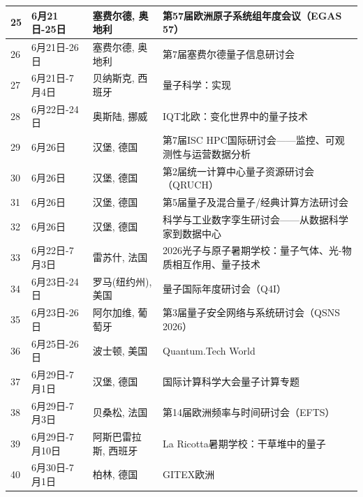 \documentclass[12pt,a4paper]{ctexart}
\begin{document}
{\begin{longtable}{C{0.8cm}L{2.5cm}L{3cm}L{7cm}}
        25 & 6月21日-25日 & 塞费尔德, 奥地利 & 第57届欧洲原子系统组年度会议（EGAS 57） \\
        \midrule[0.05pt]
        
        26 & 6月21日-26日 & 塞费尔德, 奥地利 & 第7届塞费尔德量子信息研讨会 \\
        \midrule[0.05pt]
        
        27 & 6月21日-7月4日 & 贝纳斯克, 西班牙 & 量子科学：实现 \\
        \midrule[0.05pt]
        
        28 & 6月22日-24日 & 奥斯陆, 挪威 & IQT北欧：变化世界中的量子技术 \\
        \midrule[0.05pt]
        
        29 & 6月26日 & 汉堡, 德国 & 第7届ISC HPC国际研讨会——监控、可观测性与运营数据分析 \\
        \midrule[0.05pt]
        
        30 & 6月26日 & 汉堡, 德国 & 第2届统一计算中心量子资源研讨会（QRUCH） \\
        \midrule[0.05pt]
        
        31 & 6月26日 & 汉堡, 德国 & 第5届量子及混合量子/经典计算方法研讨会 \\
        \midrule[0.05pt]
        
        32 & 6月26日 & 汉堡, 德国 & 科学与工业数字孪生研讨会——从数据科学家到数据中心 \\
        \midrule[0.05pt]
        
        33 & 6月22日-7月3日 & 雷苏什, 法国 & 2026光子与原子暑期学校：量子气体、光-物质相互作用、量子技术 \\
        \midrule[0.05pt]
        
        34 & 6月23日-24日 & 罗马(纽约州), 美国 & 量子国际年度研讨会（Q4I） \\
        \midrule[0.05pt]
        
        35 & 6月23日-26日 & 阿尔加维, 葡萄牙 & 第3届量子安全网络与系统研讨会（QSNS 2026） \\
        \midrule[0.05pt]
        
        36 & 6月25日-26日 & 波士顿, 美国 & Quantum.Tech World \\
        \midrule[0.05pt]
        
        37 & 6月29日-7月1日 & 汉堡, 德国 & 国际计算科学大会量子计算专题 \\
        \midrule[0.05pt]
        
        38 & 6月29日-7月3日 & 贝桑松, 法国 & 第14届欧洲频率与时间研讨会（EFTS） \\
        \midrule[0.05pt]
        
        39 & 6月29日-7月10日 & 阿斯巴雷拉斯, 西班牙 & La Ricotta暑期学校：干草堆中的量子 \\
        \midrule[0.05pt]
        
        40 & 6月30日-7月1日 & 柏林, 德国 & GITEX欧洲 \\
        \midrule[0.05pt]
        
    \end{longtable}
}
\end{document}
